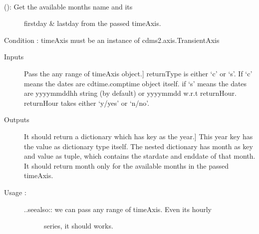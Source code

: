 \documentclass[letterpaper,10pt,english]{sphinxmanual}
\begin{document}
\begin{fulllineitems}

\begin{fulllineitems}
\label{diagnosisutils:xml_data_access.TimeUtility.getTimeAxisMonths}~\begin{description}
\item[{{\hyperref[diagnosisutils:xml_data_access.TimeUtility.getTimeAxisMonths]{}} (): Get the available months name and its}] \leavevmode
firstday \& lastday from the passed timeAxis.

\end{description}

Condition : timeAxis must be an instance of cdms2.axis.TransientAxis
\begin{description}
\item[{Inputs}] \leavevmode{[}Pass the any range of timeAxis object.{]}
returnType is either `c' or `s'. If `c' means the dates are
cdtime.comptime object itself. if `s' means the dates are
yyyymmddhh string (by default) or yyyymmdd w.r.t returnHour.
returnHour takes either `y/yes' or `n/no'.

\item[{Outputs}] \leavevmode{[}It should return a dictionary which has key as the year.{]}
This year key has the value as dictionary type itself.
The nested dictionary has month as key and
value as tuple, which contains the stardate and enddate of
that month.
It should return month only for the available months in the
passed timeAxis.

\item[{Usage :}] \leavevmode\begin{description}
\item[{..seealso:: we can pass any range of timeAxis. Even its hourly}] \leavevmode
series, it should works.

\end{description}

\end{description}


\end{fulllineitems}
\end{fulllineitems}
\end{document}
